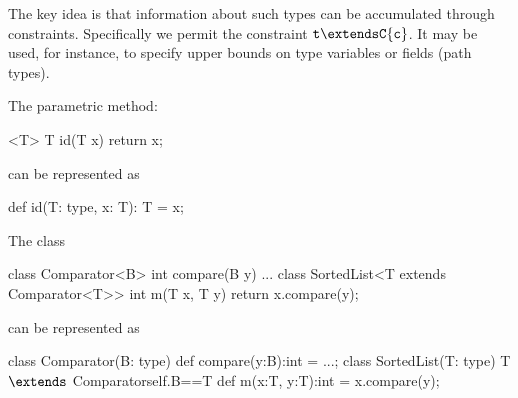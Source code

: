 The key idea is that information about such types can
be accumulated through constraints.  Specifically we
permit the constraint ${\tt t \extends C\{c\}}$. It may be used, for
instance, to specify upper bounds on type variables or fields (path
types).


\begin{example}
The \FGJ{} parametric method:

\begin{xten} 
 <T> T id(T x) { return x; }
\end{xten}
\noindent can be represented as
\begin{xten} 
def id(T: type, x: T): T = x;
\end{xten}
\end{example}

\begin{example}
\noindent The \FGJ{} class 
\begin{xten} 
class Comparator<B> {
  int compare(B y) { ... } }
class SortedList<T extends Comparator<T>> { 
  int m(T x, T y) {
     return x.compare(y); } }
\end{xten}
\noindent can be represented as
\begin{xtenmath} 
class Comparator(B: type) {
  def compare(y:B):int = ...;
}
class SortedList(T: type)
    {T $\extends$ Comparator{self.B==T}} { 
  def m(x:T, y:T):int = x.compare(y);
}
\end{xtenmath}
\end{example}

